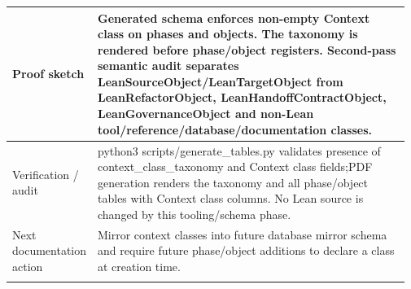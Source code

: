 \begin{longtable}{L{0.16\linewidth} L{0.81\linewidth}}
\hline\addlinespace[0.20em]
Proof sketch & Generated schema enforces non-empty Context class on phases and objects. The taxonomy is rendered before phase/\allowbreak{}object registers. Second-pass semantic audit separates LeanSourceObject/\allowbreak{}LeanTargetObject from LeanRefactorObject, LeanHandoffContractObject, LeanGovernanceObject and non-Lean tool/\allowbreak{}reference/\allowbreak{}database/\allowbreak{}documentation classes.\\
\hline\addlinespace[0.20em]
Verification /\allowbreak{} audit & python3 scripts/\allowbreak{}generate\_tables.py validates presence of context\_class\_taxonomy and Context class fields;\newline PDF generation renders the taxonomy and all phase/\allowbreak{}object tables with Context class columns. No Lean source is changed by this tooling/\allowbreak{}schema phase.\\
\hline\addlinespace[0.20em]
Next documentation action & Mirror context classes into future database mirror schema and require future phase/\allowbreak{}object additions to declare a class at creation time.\\
\hline\addlinespace[0.20em]
\end{longtable}
